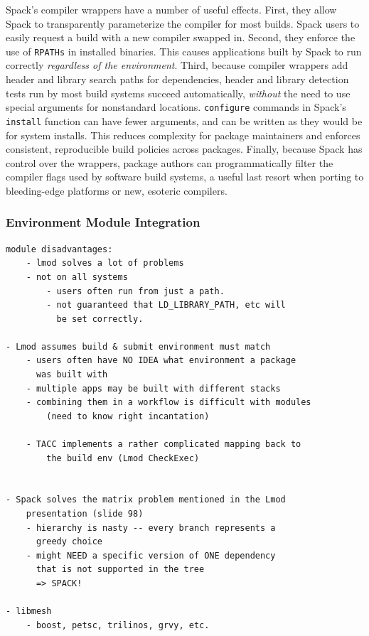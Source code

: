Spack's compiler wrappers have a number of useful effects.  First, they allow
Spack to transparently parameterize the compiler for most builds. 
Spack users to easily request a build with a new compiler swapped in.
Second, they enforce the use of {\tt RPATHs} in
installed binaries.  This causes applications built by Spack to run correctly
{\it regardless of the environment}.  Third, because compiler wrappers add 
header and library search paths for dependencies, header and library detection
tests run by most build systems succeed automatically, {\it without}
the need to use special arguments for nonstandard locations.  {\tt configure}
commands in Spack's {\tt install} function can have fewer arguments, and can
be written as they would be for system installs.  This reduces complexity
for package maintainers and enforces consistent, reproducible
build policies across packages.  Finally, because Spack has control over the 
wrappers, package authors can programmatically filter the compiler flags
used by software build systems, a useful last resort when porting to
bleeding-edge platforms or new, esoteric compilers.

\subsubsection{Environment Module Integration}



\begin{verbatim}
module disadvantages:
	- lmod solves a lot of problems
	- not on all systems
		- users often run from just a path.
		- not guaranteed that LD_LIBRARY_PATH, etc will
		  be set correctly.

- Lmod assumes build & submit environment must match
	- users often have NO IDEA what environment a package
	  was built with
	- multiple apps may be built with different stacks
	- combining them in a workflow is difficult with modules
		(need to know right incantation)

	- TACC implements a rather complicated mapping back to
	    the build env (Lmod CheckExec)
	

- Spack solves the matrix problem mentioned in the Lmod
    presentation (slide 98)
	- hierarchy is nasty -- every branch represents a
	  greedy choice
	- might NEED a specific version of ONE dependency
	  that is not supported in the tree
	  => SPACK!

- libmesh
	- boost, petsc, trilinos, grvy, etc.
\end{verbatim}

